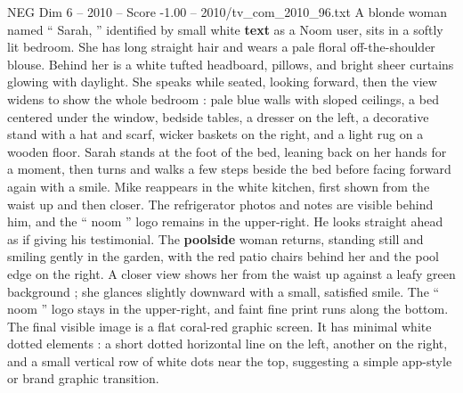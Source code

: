 \begin{textsample}{NEG Dim 6 – 2010 – Score -1.00 – 2010/tv\_com\_2010\_96.txt}
A blonde woman named “ Sarah, ” identified by small white \textbf{text} as a Noom user, sits in a softly lit bedroom.
She has long straight hair and wears a pale floral off-the-shoulder blouse.
Behind her is a white tufted headboard, pillows, and bright sheer curtains glowing with daylight.
She speaks while seated, looking forward, then the view widens to show the whole bedroom : pale blue walls with sloped ceilings, a bed centered under the window, bedside tables, a dresser on the left, a decorative stand with a hat and scarf, wicker baskets on the right, and a light rug on a wooden floor.
Sarah stands at the foot of the bed, leaning back on her hands for a moment, then turns and walks a few steps beside the bed before facing forward again with a smile.
Mike reappears in the white kitchen, first shown from the waist up and then closer.
The refrigerator photos and notes are visible behind him, and the “ noom ” logo remains in the upper-right.
He looks straight ahead as if giving his testimonial.
The \textbf{poolside} woman returns, standing still and smiling gently in the garden, with the red patio chairs behind her and the pool edge on the right.
A closer view shows her from the waist up against a leafy green background ; she glances slightly downward with a small, satisfied smile.
The “ noom ” logo stays in the upper-right, and faint fine print runs along the bottom.
The final visible image is a flat coral-red graphic screen.
It has minimal white dotted elements : a short dotted horizontal line on the left, another on the right, and a small vertical row of white dots near the top, suggesting a simple app-style or brand graphic transition.

\end{textsample}
